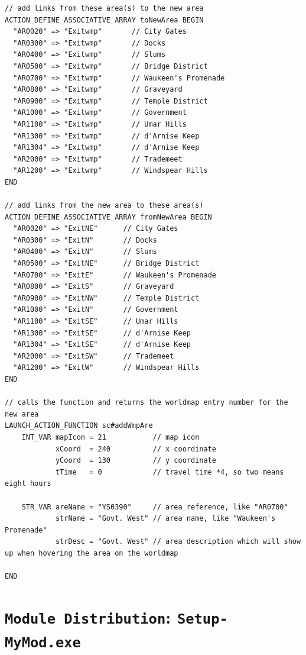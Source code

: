 \documentclass{article}
\def\DEFINE#1{{\tt \bf #1}\label{#1}\index{#1}}
\def\t#1{{\tt #1}}
\begin{document}
\begin{verbatim}
// add links from these area(s) to the new area
ACTION_DEFINE_ASSOCIATIVE_ARRAY toNewArea BEGIN
  "AR0020" => "Exitwmp"       // City Gates
  "AR0300" => "Exitwmp"       // Docks
  "AR0400" => "Exitwmp"       // Slums
  "AR0500" => "Exitwmp"       // Bridge District
  "AR0700" => "Exitwmp"       // Waukeen's Promenade
  "AR0800" => "Exitwmp"       // Graveyard
  "AR0900" => "Exitwmp"       // Temple District
  "AR1000" => "Exitwmp"       // Government
  "AR1100" => "Exitwmp"       // Umar Hills
  "AR1300" => "Exitwmp"       // d'Arnise Keep
  "AR1304" => "Exitwmp"       // d'Arnise Keep
  "AR2000" => "Exitwmp"       // Trademeet
  "AR1200" => "Exitwmp"       // Windspear Hills
END

// add links from the new area to these area(s)
ACTION_DEFINE_ASSOCIATIVE_ARRAY fromNewArea BEGIN
  "AR0020" => "ExitNE"      // City Gates
  "AR0300" => "ExitN"       // Docks
  "AR0400" => "ExitN"       // Slums
  "AR0500" => "ExitNE"      // Bridge District
  "AR0700" => "ExitE"       // Waukeen's Promenade
  "AR0800" => "ExitS"       // Graveyard
  "AR0900" => "ExitNW"      // Temple District
  "AR1000" => "ExitN"       // Government
  "AR1100" => "ExitSE"      // Umar Hills
  "AR1300" => "ExitSE"      // d'Arnise Keep
  "AR1304" => "ExitSE"      // d'Arnise Keep
  "AR2000" => "ExitSW"      // Trademeet
  "AR1200" => "ExitW"       // Windspear Hills
END

// calls the function and returns the worldmap entry number for the new area
LAUNCH_ACTION_FUNCTION sc#addWmpAre
    INT_VAR mapIcon = 21           // map icon
            xCoord  = 240          // x coordinate
            yCoord  = 130          // y coordinate
            tTime   = 0            // travel time *4, so two means eight hours

    STR_VAR areName = "YS0390"     // area reference, like "AR0700"
            strName = "Govt. West" // area name, like "Waukeen's Promenade"
            strDesc = "Govt. West" // area description which will show up when hovering the area on the worldmap

END
\end{verbatim}

\label{sec-module-distribution}\section{\DEFINE{Module Distribution}: \t{Setup-MyMod.exe}}
\end{document}
